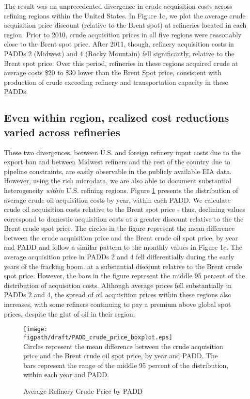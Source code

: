\documentclass[12pt]{article}
\newcommand{\figpath}{../output/offline/figures}
\begin{document}
The result was an unprecedented divergence in crude acquisition costs across refining regions within the United States. In Figure 1c, we plot the average crude acquisition price discount (relative to the Brent spot) at refineries located in each region. Prior to 2010, crude acquisition prices in all five regions were reasonably close to the Brent spot price. After 2011, though, refinery acquisition costs in PADDs 2 (Midwest) and 4 (Rocky Mountain) fell significantly, relative to the Brent spot price.  Over this period, refineries in these regions acquired crude at average costs \$20 to \$30 lower than the Brent Spot price, consistent with production of crude exceeding refinery and transportation capacity in these PADDs.

\subsection{Even within region, realized cost reductions varied across refineries}

These two divergences, between U.S. and foreign refinery input costs due to the export ban and between Midwest refiners and the rest of the country due to pipeline constraints, are easily observable in the publicly available EIA data. However, using the rich microdata, we are also able to document substantial heterogeneity \textit{within} U.S. refining regions. Figure \ref{fig:crude_boxplot} presents the distribution of average crude oil acquisition costs by year, within each PADD.    We calculate crude oil acquisition costs relative to the Brent spot price - thus, declining values correspond to domestic acquisition costs at a greater discount relative to the the Brent crude spot price.  The circles in the figure represent the mean difference between the crude acquisition price and the Brent crude oil spot price, by year and PADD and follow a similar pattern to the monthly values in  Figure 1c.  The average acquisition price in PADDs 2 and 4 fell differentially during the early years of the fracking boom, at a substantial discount relative to the Brent crude spot price. However, the bars in the figure represent the middle 95 percent of the distribution of acquisition costs.  Although average prices fell substantially in PADDs 2 and 4, the spread of oil acquisition prices within these regions also increases, with some refiners continuing to pay a premium above global spot prices, despite the glut of oil in their region.

\begin{figure}[]
  \begin{centering}
  \caption{Average Refinery Crude Price by PADD \label{fig:crude_boxplot}}
  \par\end{centering}
  \centering{}\texttt{[image: \\figpath/draft/PADD\_crude\_price\_boxplot.eps]} \\

  \scriptsize
  Circles represent the mean difference between the crude acquisition price and the Brent crude oil spot price, by year and PADD.  The bars represent the range of the middle 95 percent of the distribution, within each year and PADD.
\end{figure}
\end{document}
